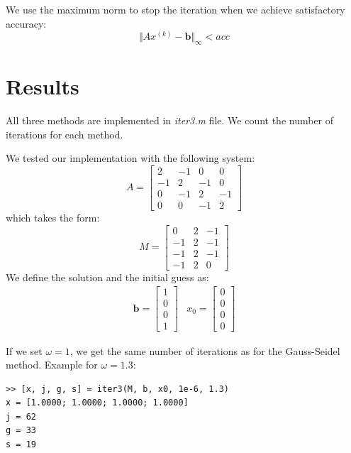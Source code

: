 \documentclass[]{article}
\begin{document}
We use the maximum norm to stop the iteration when we achieve satisfactory
accuracy:
\begin{equation*}
	\Vert Ax^{(k)} - \mathbf{b} \Vert_{\infty} < acc
\end{equation*}


\section{Results}

All three methods are implemented in \textit{iter3.m} file. We count the number
of iterations for each method.

We tested our implementation with the following system:
\begin{equation*}
		A = \begin{bmatrix}
	2 & -1 & 0 & 0 \\
	-1 & 2 & -1 & 0 \\
	0 & -1 & 2 & -1 \\
	0 & 0 & -1 & 2
	\end{bmatrix}
\end{equation*}
which takes the form:
\begin{equation*}
	M = \begin{bmatrix}
		0 & 2 & -1 \\
		-1 & 2 & -1 \\
		-1 & 2 & -1 \\
		-1 & 2 & 0
	\end{bmatrix}
\end{equation*}
We define the solution and the initial guess as:
\begin{align*}
	\mathbf{b} = \begin{bmatrix}
		1 \\ 0 \\ 0 \\ 1
	\end{bmatrix}
	&
	x_0 = \begin{bmatrix}
		0 \\ 0 \\ 0 \\ 0
	\end{bmatrix}
\end{align*}

If we set $\omega = 1$, we get the same number of iterations as for the
Gauss-Seidel method. Example for $\omega = 1.3$:

\begin{lstlisting}
>> [x, j, g, s] = iter3(M, b, x0, 1e-6, 1.3)
x = [1.0000; 1.0000; 1.0000; 1.0000]
j = 62
g = 33
s = 19
\end{lstlisting}
\end{document}
